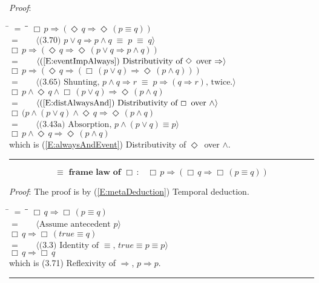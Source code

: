 \documentclass[12pt, fleqn, leqno]{article}
\newcommand{\lgap}{2pt}                             %
\newcommand{\mymathindent}{24pt}                    %
\newcommand{\equivs}{\ensuremath{\;\equiv\;}}       %
\newcommand{\impl}{\ensuremath{\Rightarrow}}        %
\newcommand{\Event}{\Diamond\,}
\newcommand{\Always}{\Box\,}
\newcommand{\myqed}{\rule[-.23ex]{1.2ex}{2.0ex}}
\newcommand{\myqedtab}{\hspace{384pt}}              %
\newcommand{\Gll} {\langle}                         %
\newcommand{\Ggg} {\rangle}                         %
\newcommand{\Hint}[1]     {\ \ \ $\Gll              \mbox{#1} \Ggg$ }   %
\begin{document}
\emph{Proof}: 
\begin{tabbing}
\hspace{\mymathindent} \= $= \;$ \= \myqedtab \= \kill
  \> \>   $\Always p \impl (\Event q \impl \Event (p \equiv q))$\\[\lgap]
  \> $=$  \>  \Hint{(3.70) $p\lor q \impl p\land q \equivs p \equivs q$}\\[\lgap]
  \> \>   $\Always p \impl (\Event q \impl \Event (p \lor q \impl p \land q))$\\[\lgap]
  \> $=$  \>  \Hint{(\ref{E:eventImpAlways}) Distributivity of $\Event$ over $\impl$}\\[\lgap]
  \> \>   $\Always p \impl (\Event q \impl (\Always (p \lor q) \impl \Event (p \land q)))$\\[\lgap]
   \> $=$  \>  \Hint{(3.65) Shunting, $p\land q\impl r\equivs p\impl (q\impl r)$, twice.}\\[\lgap]
  \> \>   $\Always p \land \Event q  \land \Always (p \lor q) \impl \Event (p \land q) $\\[\lgap]
   \> $=$  \>  \Hint{(\ref{E:distAlwaysAnd}) Distributivity of $\Always$ over $\land$}\\[\lgap]
  \> \>   $\Always (p  \land (p \lor q) \land \Event q  \impl \Event (p \land q)$\\[\lgap]
   \> $=$  \>  \Hint{(3.43a) Absorption, $p \land (p \lor q) \equiv p$}\\[\lgap]
   \> \>   $\Always p  \land \Event q  \impl \Event (p \land q)$\\[\lgap]
   \> which is (\ref{E:alwaysAndEvent}) Distributivity of $\Event$ over $\land$. \quad \myqed
\end{tabbing}
\begin{equation}\label{E:equivframelawAlways}
\textbf{$\equiv$ frame law of $\Always$:}\quad \Always p \impl (\Always q \impl \Always (p \equiv q))
\end{equation}

\emph{Proof}: The proof is by (\ref{E:metaDeduction}) Temporal deduction.
\begin{tabbing}
\hspace{\mymathindent} \= $= \;$ \= \myqedtab \= \kill
  \> \>   $\Always q \impl \Always (p \equiv q)$\\[\lgap]
  \> $=$  \>  \Hint{Assume antecedent $p$}\\[\lgap]
  \> \>   $\Always q \impl \Always (true \equiv q)$\\[\lgap]
  \> $=$  \>  \Hint{(3.3) Identity of $\equiv$, $true \equiv p \equiv p$}\\[\lgap]
  \> \>   $\Always q \impl \Always q$\\[\lgap]
  \> which is (3.71) Reflexivity of $\impl$, $p\impl p$. \quad \myqed
  \end{tabbing}
\end{document}
